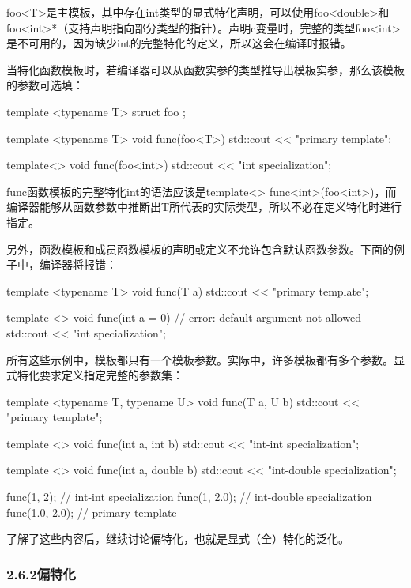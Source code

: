 foo<T>是主模板，其中存在int类型的显式特化声明，可以使用foo<double>和foo<int>*（支持声明指向部分类型的指针）。声明c变量时，完整的类型foo<int>是不可用的，因为缺少int的完整特化的定义，所以这会在编译时报错。

当特化函数模板时，若编译器可以从函数实参的类型推导出模板实参，那么该模板的参数可选填：

\begin{cpp}
template <typename T>
struct foo {};

template <typename T>
void func(foo<T>)
{
	std::cout << "primary template\n";
}

template<>
void func(foo<int>)
{
	std::cout << "int specialization\n";
}
\end{cpp}

func函数模板的完整特化int的语法应该是template<> func<int>(foo<int>)，而编译器能够从函数参数中推断出T所代表的实际类型，所以不必在定义特化时进行指定。

另外，函数模板和成员函数模板的声明或定义不允许包含默认函数参数。下面的例子中，编译器将报错：

\begin{cpp}
template <typename T>
void func(T a)
{
	std::cout << "primary template\n";
}

template <>
void func(int a = 0) // error: default argument not allowed
{
	std::cout << "int specialization\n";
}
\end{cpp}

所有这些示例中，模板都只有一个模板参数。实际中，许多模板都有多个参数。显式特化要求定义指定完整的参数集：

\begin{cpp}
template <typename T, typename U>
void func(T a, U b)
{
	std::cout << "primary template\n";
}

template <>
void func(int a, int b)
{
std::cout << "int-int specialization\n";
}

template <>
void func(int a, double b)
{
std::cout << "int-double specialization\n";
}

func(1, 2); // int-int specialization
func(1, 2.0); // int-double specialization
func(1.0, 2.0); // primary template
\end{cpp}

了解了这些内容后，继续讨论偏特化，也就是显式（全）特化的泛化。

\subsubsection{2.6.2\hspace{0.2cm}偏特化}

